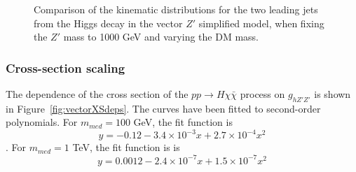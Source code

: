 \begin{figure}[hbpt!]
	\caption{Comparison of the kinematic distributions for the two leading jets from the Higgs decay in the vector $Z'$ simplified model, 
		when fixing the $Z'$ mass to 1000 GeV and varying the DM mass. 
		\label{fig:VectorHbb_1000}}
\end{figure}


\subsubsection{Cross-section scaling}

The dependence of the cross section of the $pp \rightarrow H\chi\bar{\chi}$ process 
on $g_{hZ'Z'}$ is shown in Figure~\ref{fig:vectorXSdeps}. 
The curves have been fitted to second-order polynomials. 
For $m_{med} = 100$ GeV, the fit function is 
$$y = -0.12 - 3.4\times10^{-3}x + 2.7\times10^{-4}x^2$$.
For $m_{med} = 1$ TeV, the fit function is 
is $$y = 0.0012 - 2.4\times10^{-7}x + 1.5\times10^{-7}x^2$$

